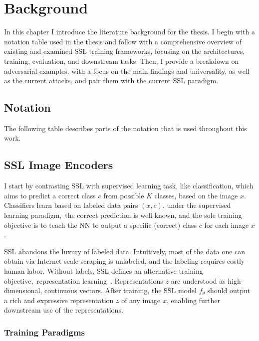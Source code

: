 \chapter{Background}
\label{chap:background}

In this chapter I introduce the literature background for the thesis. I begin with a notation table used in the thesis and follow with a comprehensive overview of existing and examined SSL training frameworks, focusing on the architectures, training, evaluation, and downstream tasks. Then, I provide a breakdown on adversarial examples, with a focus on the main findings and universality, as well as the current attacks, and pair them with the current SSL paradigm.

\section{Notation}

The following table describes parts of the notation that is used throughout this work.



\section{SSL Image Encoders}\label{sec:ssl_bg}

I start by contrasting SSL with supervised learning task, like classification, which aims to predict a correct class $c$ from possible $K$ classes, based on the image $x$. Classifiers learn based on labeled data pairs $(x, c)$, under the supervised learning paradigm,~\ie the correct prediction is well known, and the sole training objective is to teach the NN to output a specific (correct) class $c$ for each image $x$.

SSL abandons the luxury of labeled data. Intuitively, most of the data one can obtain via Internet-scale scraping is unlabeled, and the labeling requires costly human labor. Without labels, SSL defines an alternative training objective,~\ie representation learning~\cite{ogssl}. Representations $z$ are understood as high-dimensional, continuous vectors. After training, the SSL model $f_\theta$ should output a rich and expressive representation $z$ of any image $x$, enabling further downstream use of the representations.

\subsection{Training Paradigms}\label{sec:ssl_training}

